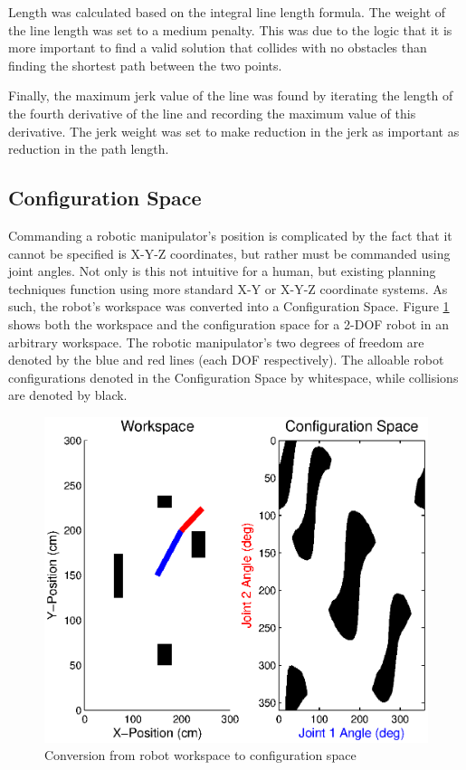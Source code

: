 Length was calculated based on the integral line length formula. The weight of the line length was set to a medium penalty. This was due to the logic that it is more important to find a valid solution that collides with no obstacles than finding the shortest path between the two points.

Finally, the maximum jerk value of the line was found by iterating the length of the fourth derivative of the line and recording the maximum value of this derivative. The jerk weight was set to make reduction in the jerk as important as reduction in the path length.

\subsection{Configuration Space}
Commanding a robotic manipulator's position is complicated by the fact that it cannot be specified is X-Y-Z coordinates, but rather must be commanded using joint angles. Not only is this not intuitive for a human, but existing planning techniques function using more standard X-Y or X-Y-Z coordinate systems. As such, the robot's workspace was converted into a Configuration Space. Figure \ref{fig:ws2cs} shows both the workspace and the configuration space for a 2-DOF robot in an arbitrary workspace. The robotic manipulator's two degrees of freedom are denoted by the blue and red lines (each DOF respectively). The alloable robot configurations denoted in the Configuration Space by whitespace, while collisions are denoted by black.

\begin{figure}[h]
	\centering
	\includegraphics{./figures/wp2cs.eps}
	\caption{Conversion from robot workspace to configuration space }
	\label{fig:ws2cs}
\end{figure}

